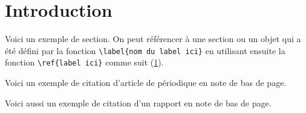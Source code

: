 \section{Introduction}\label{section1}

Voici un exemple de section. On peut référencer à une section ou un objet qui a été défini par la fonction \verb|\label{nom du label ici}| en utilisant ensuite la fonction \verb|\ref{label ici}| comme suit (\ref{section1}). 

Voici un exemple de citation d'article de périodique en note de bas de page.\autocite[36]{Periodique2021}

Voici aussi un exemple de citation d'un rapport en note de bas de page.\autocite[579]{Rapport2021}

